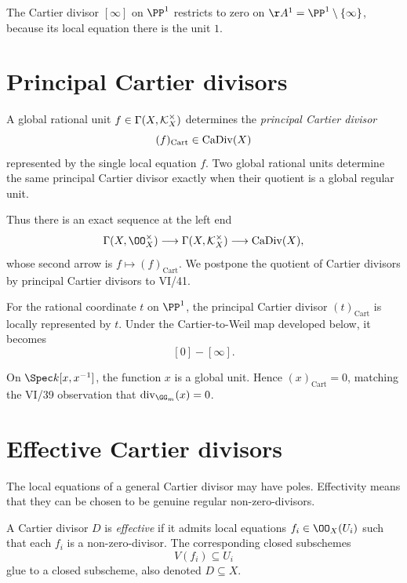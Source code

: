 \begin{example}\label{ex:vi40-restrict-infinity}
The Cartier divisor \([\infty]\) on \(\PP^1\) restricts to zero on \(\AA^1=\PP^1\setminus\{\infty\}\), because its local equation there is the unit \(1\).
\end{example}

\section{Principal Cartier divisors}
\begin{definition}\label{def:vi40-principal}
A global rational unit \(f\in\Gamma(X,\mathcal{K}_X^\times)\) determines the \emph{principal Cartier divisor}
\[
 (f)_{\mathrm{Cart}}\in\operatorname{CaDiv}(X)
\]
represented by the single local equation \(f\).  Two global rational units determine the same principal Cartier divisor exactly when their quotient is a global regular unit.
\end{definition}

Thus there is an exact sequence at the left end
\[
 \Gamma(X,\OO_X^\times)
 \longrightarrow
 \Gamma(X,\KX^\times)
 \longrightarrow
 \CaDiv(X),
\]
whose second arrow is \(f\mapsto(f)_{\mathrm{Cart}}\).  We postpone the quotient of Cartier divisors by principal Cartier divisors to VI/41.

\begin{example}\label{ex:vi40-principal-p1}
For the rational coordinate \(t\) on \(\PP^1\), the principal Cartier divisor \((t)_{\mathrm{Cart}}\) is locally represented by \(t\).  Under the Cartier-to-Weil map developed below, it becomes
\[
 [0]-[\infty].
\]
\end{example}

\begin{example}\label{ex:vi40-unit-zero}
On \(\Spec k[x,x^{-1}]\), the function \(x\) is a global unit.  Hence \((x)_{\mathrm{Cart}}=0\), matching the VI/39 observation that \(\operatorname{div}_{\GG_m}(x)=0\).
\end{example}

\section{Effective Cartier divisors}
The local equations of a general Cartier divisor may have poles.  Effectivity means that they can be chosen to be genuine regular non-zero-divisors.

\begin{definition}\label{def:vi40-effective}
A Cartier divisor \(D\) is \emph{effective} if it admits local equations \(f_i\in\OO_X(U_i)\) such that each \(f_i\) is a non-zero-divisor.  The corresponding closed subschemes
\[
 V(f_i)\subseteq U_i
\]
glue to a closed subscheme, also denoted \(D\subseteq X\).
\end{definition}

